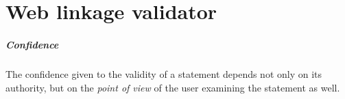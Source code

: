 \section{Web linkage validator}

\subparagraph{Confidence}

The confidence given to the validity of a statement depends not only on its authority, but on the \emph{point of view} of the user examining the statement as well.
